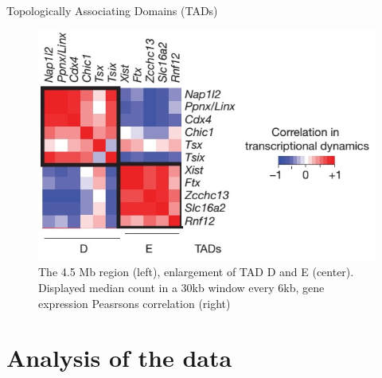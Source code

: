 \documentclass[8pt]{beamer}
\begin{document}
\begin{frame}{Topologically Associating Domains (TADs)}
\begin{figure}[H]
\includegraphics[scale=0.27]{transcriptionCorrelationTadDandENoraEtAl2012}
\caption{\tiny{The 4.5 Mb region (left), enlargement of TAD D and E (center). Displayed median count in a 30kb window every 6kb, gene expression Peasrsons correlation (right)}}
\label{fig:TADsOfTheXChromosome_NoraEtAl2012}
\end{figure}
\end{frame}

\section{Analysis of the data}\label{section_analysisOfTheData}
\end{document}
